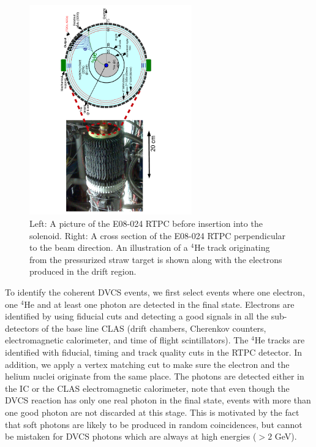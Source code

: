 \documentclass[nofootinbib,twocolumn,showpacs,prl,superscriptaddress,secnumarabic,amssymb,nobibnotes,aps,floatfix]{revtex4}
\begin{document}
\begin{figure}[tb]
\vspace{-1.1cm}
\includegraphics[width=7.0cm,angle=-90]{figs/RTPC.pdf}
\vspace{-1.1cm}
\caption{Left: A picture of the E08-024 RTPC before insertion into the 
   solenoid. Right: A cross section of the E08-024 RTPC perpendicular to the 
   beam direction. An illustration of a $^4$He track originating from the 
   pressurized straw target is shown along with the electrons produced in the 
   drift region.}
\label{fig:RTPC}
\end{figure}

To identify the coherent DVCS events, we first select events where one 
electron, one $^4$He and at least one photon are detected in the final state. 
Electrons are identified by using fiducial cuts and detecting a good
signals in all the sub-detectors of the base line CLAS (drift chambers, 
Cherenkov counters, electromagnetic calorimeter, and time of flight 
scintillators). The $^4$He tracks are identified with fiducial, 
timing and track quality cuts in the RTPC detector. In addition,
we apply a vertex matching cut to make sure the electron and the helium
nuclei originate from the same place. The photons are detected either
in the IC or the CLAS electromagnetic calorimeter, note that even though the 
DVCS reaction has only one real photon in the final state, 
events with more than one good photon are not discarded at this stage. This is 
motivated by the fact that soft photons are likely to be produced in random 
coincidences, but cannot be mistaken for DVCS photons which are always at high
energies ($>2$ GeV).
\end{document}
